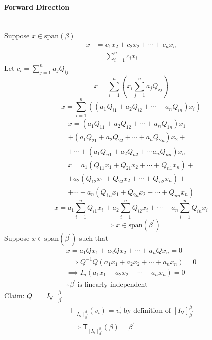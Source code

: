 \paragraph{Forward Direction}\hfill\\
Suppose $x \in \text{span}(\beta)$
\begin{align}
x &= c_1x_2 + c_2x_2 + \cdots + c_nx_n\\
&= \sum\limits_{i=1}^nc_ix_i
\end{align}
Let $c_i =\sum\limits_{j=1}^na_jQ_{ij}$
\begin{equation}
x = \sum\limits_{i=1}^n\left(x_i\sum\limits_{j=1}^na_jQ_{ij}\right)
\end{equation}
\begin{equation}
x = \sum\limits_{i=1}^n\left(\left(a_1Q_{i1} + a_2Q_{i2} +\cdots +a_nQ_{in}\right)x_i\right)
\end{equation}
\begin{multline}
x = (a_1Q_{11} + a_2Q_{12} + \cdots + a_nQ_{1n})x_1 +\\ 
+ (a_1Q_{21} + a_2Q_{22} + \cdots +a_nQ_{2n})x_2 + \\
+ \cdots + (a_1Q_{n1} + a_2Q_{n2} + \cdots a_nQ_{nn})x_n
\end{multline}
\begin{multline}
x = a_1(Q_{11}x_1 +Q_{21}x_2 + \cdots +Q_{n1}x_n) + \\
+ a_2(Q_{12}x_1 + Q_{22}x_2 + \cdots + Q_{n2}x_n) +\\
+\cdots + a_n(Q_{1n}x_1 + Q_{2n}x_2 + \cdots + Q_{nn}x_n)
\end{multline}
\begin{equation}
x = a_1\sum\limits_{i=1}^nQ_{i1}x_i +a_2\sum\limits_{i=1}^nQ_{i2}x_i
+\cdots +a_n\sum\limits_{i=1}^nQ_{in}x_i
\end{equation}
\begin{equation}
\implies x \in \text{span}(\beta^\prime)
\end{equation}
Suppose $x \in \text{span}(\beta^\prime)$ such that
\begin{gather}
x = a_1Qx_1 + a_2Qx_2 + \dotsb + a_nQx_n = 0\\
\implies Q^{-1}Q(a_1x_1 + a_2x_2 + \dotsb + a_nx_n) = 0\\
\implies I_n(a_1x_1 + a_2x_2 + \dotsb + a_nx_n) = 0\\
\therefore \beta^\prime \;\text{is linearly independent}
\end{gather}
Claim: $Q =[I_\mathsf{V}]_{\beta^\prime}^\beta$
\begin{gather}
\mathsf{T}_{[I_\mathsf{V}]_{\beta^\prime}^\beta}(v_i) = v_i^\prime\;\text{by
  definition of } [I_\mathsf{V}]_{\beta^\prime}^\beta\\
\implies \mathsf{T}_{[I_\mathsf{V}]_{\beta^\prime}^\beta}(\beta) = \beta^\prime
\end{gather}
